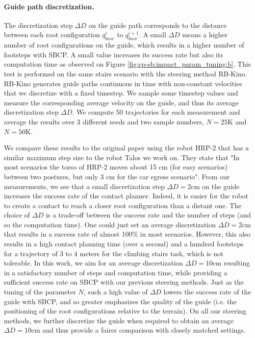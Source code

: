 \paragraph{Guide path discretization.}
The discretization step $\Delta D$ on the guide path corresponds to the distance between each root configuration $q_{base}^i$ to $q_{base}^{i+1}$. A small $\Delta D$ means a higher number of root configurations on the guide, which results in a higher number of footsteps with SBCP. 
A small value increases its success rate but also its computation time as observed on Figure \ref{fig:cp-sb:impact_param_tuning:b}.
This test is performed on the same stairs scenario with the steering method RB-Kino. 
RB-Kino generates guide paths continuous in time with non-constant velocities that
we discretize with a fixed timestep. 
We sample some timestep values and measure the corresponding average velocity on the guide, and thus its average discretization step $\Delta D$.
We compute 50 trajectories for each measurement and average the results over 3 different seeds and two sample numbers, $N=25$K and $N=50$K. 

We compare these results to the original paper \cite{AcyclicCP} using the robot HRP-2 that has a similar maximum step size to the robot Talos we work on. They state that "In most scenarios the torso of HRP-2 moves about 15 cm (for easy scenarios) between two postures, but only 3 cm for the car egress scenario". 
From our measurements, we see that a small discretization step $\Delta D=2$cm on the guide increases the success rate of the contact planner. 
Indeed, it is easier for the robot to create a contact to reach a closer root configuration than a distant one.
The choice of $\Delta D$ is a trade-off between the success rate and the number of steps (and so the computation time). 
One could just set an average discretization $\Delta D=2$cm that results in a success rate of almost 100\% in most scenarios. However, this also results in a high contact planning time (over a second) and a hundred footsteps for a trajectory of 3 to 4 meters for the climbing stairs task, which is not tolerable.
In this work, we aim for an average discretization $\Delta D=10$cm resulting in a satisfactory number of steps and computation time, while providing a sufficient success rate on SBCP with our previous steering methods. 
Just as the tuning of the parameter $N$, such a high value of $\Delta D$ lowers the success rate of the guide with SBCP, and so greater emphasizes the quality of the guide (i.e. the positioning of the root configurations relative to the terrain).
On all our steering methods, we further discretize the guide when required to obtain an average $\Delta D=10$cm and thus provide a fairer comparison with closely matched settings.


